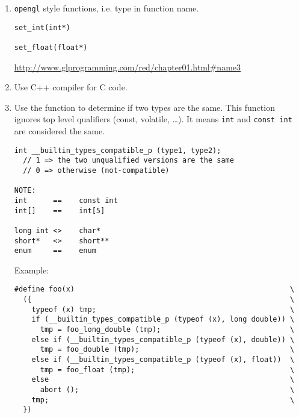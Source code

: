 \begin{enumerate}
\begin{verbatim}
void set_overload (my_struct *whatever) 
{
    switch (whatever->type) 
    {
    	case T_INT:
    		whatever->my_union.a = 1;
    		break;
    	case T_FLOAT:
    		whatever->my_union.b = 2.0;
    		break;
    	case T_CHAR:
    		whatever->my_union.c = '3';
    }
}

void printf_overload (my_struct *whatever) {
    switch (whatever->type) 
    {
    	case T_INT:
    		printf("%d\n", whatever->my_union.a);
    		break;
    	case T_FLOAT:
    		printf("%f\n", whatever->my_union.b);
    		break;
    	case T_CHAR:
    		printf("%c\n", whatever->my_union.c);
    		break;
    }

}

int main (int argc, char* argv[])
{
    my_struct s;

    s.type=T_INT;
    set_overload(&s);
    printf_overload(&s);
}
\end{verbatim}
  
  \item \verb!opengl! style functions, i.e. type in function name. 
\begin{verbatim}
set_int(int*)

set_float(float*)

\end{verbatim}

\url{http://www.glprogramming.com/red/chapter01.html\#name3}
  
  \item Use C++ compiler for C code.
  
  \item Use the function to determine if two types are the same. This function
  ignores top level qualifiers (const, volatile, \ldots). It means \verb!int!
  and \verb!const int! are considered the same. 
\begin{verbatim}
int __builtin_types_compatible_p (type1, type2);
  // 1 => the two unqualified versions are the same
  // 0 => otherwise (not-compatible)

NOTE:
int      ==    const int
int[]    ==    int[5]

long int <>    char*
short*   <>    short**
enum     ==    enum  
\end{verbatim}   

Example: 
\begin{verbatim}
#define foo(x)                                                  \
  ({                                                            \
    typeof (x) tmp;                                             \
    if (__builtin_types_compatible_p (typeof (x), long double)) \
      tmp = foo_long_double (tmp);                              \
    else if (__builtin_types_compatible_p (typeof (x), double)) \
      tmp = foo_double (tmp);                                   \
    else if (__builtin_types_compatible_p (typeof (x), float))  \
      tmp = foo_float (tmp);                                    \
    else                                                        \
      abort ();                                                 \
    tmp;                                                        \
  })


\end{verbatim}
\end{enumerate}
